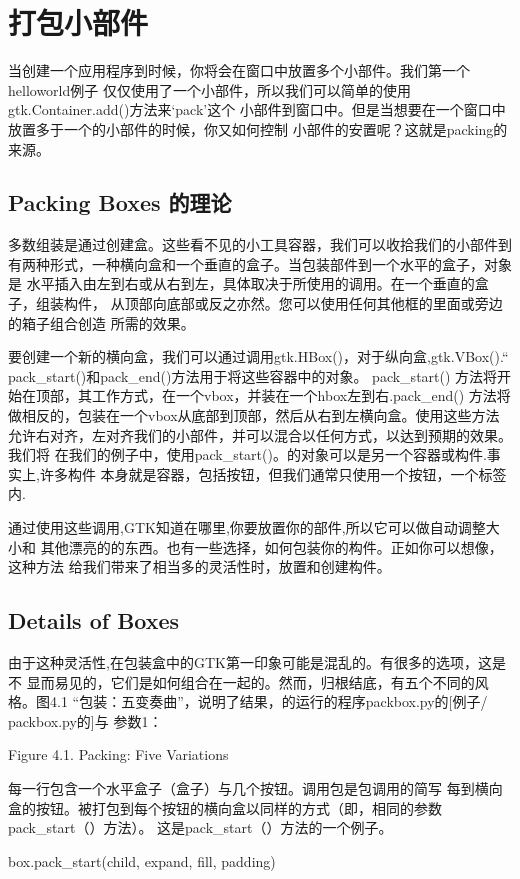 \chapter{打包小部件}
当创建一个应用程序到时候，你将会在窗口中放置多个小部件。我们第一个helloworld例子
仅仅使用了一个小部件，所以我们可以简单的使用gtk.Container.add()方法来‘pack’这个
小部件到窗口中。但是当想要在一个窗口中放置多于一个的小部件的时候，你又如何控制
小部件的安置呢？这就是packing的来源。
\section{Packing Boxes 的理论}
多数组装是通过创建盒。这些看不见的小工具容器，我们可以收拾我们的小部件到
有两种形式，一种横向盒和一个垂直的盒子。当包装部件到一个水平的盒子，对象是
水平插入由左到右或从右到左，具体取决于所使用的调用。在一个垂直的盒子，组装构件，
从顶部向底部或反之亦然。您可以使用任何其他框的里面或旁边的箱子组合创造
所需的效果。


要创建一个新的横向盒，我们可以通过调用gtk.HBox()，对于纵向盒,gtk.VBox().“
pack_start()和pack_end()方法用于将这些容器中的对象。 pack_start()
方法将开始在顶部，其工作方式，在一个vbox，并装在一个hbox左到右.pack_end()
方法将做相反的，包装在一个vbox从底部到顶部，然后从右到左横向盒。使用这些方法
允许右对齐，左对齐我们的小部件，并可以混合以任何方式，以达到预期的效果。我们将
在我们的例子中，使用pack_start()。的对象可以是另一个容器或构件.事实上,许多构件
本身就是容器，包括按钮，但我们通常只使用一个按钮，一个标签内.


通过使用这些调用,GTK知道在哪里,你要放置你的部件,所以它可以做自动调整大小和
其他漂亮的的东西。也有一些选择，如何包装你的构件。正如你可以想像，这种方法
给我们带来了相当多的灵活性时，放置和创建构件。
\section{Details of Boxes}
由于这种灵活性,在包装盒中的GTK第一印象可能是混乱的。有很多的选项，这是不
显而易见的，它们是如何组合在一起的。然而，归根结底，有五个不同的风格。图4.1
“包装：五变奏曲”，说明了结果，的运行的程序packbox.py的[例子/ packbox.py的]与
参数1：	

Figure 4.1. Packing: Five Variations

每一行包含一个水平盒子（盒子）与几个按钮。调用包是包调用的简写
每到横向盒的按钮。被打包到每个按钮的横向盒以同样的方式（即，相同的参数
pack_start（）方法）。
这是pack_start（）方法的一个例子。

box.pack_start(child, expand, fill, padding)


